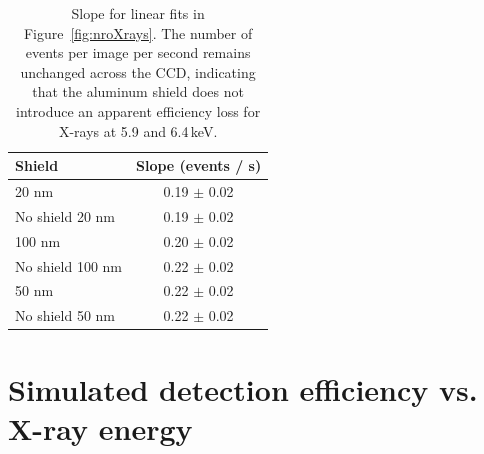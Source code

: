 \documentclass[twocolumn]{aastex631}
\begin{document}

\begin{table}
\centering
\begin{tabular}{lc}
\toprule
 Shield &  Slope (events / s) \\
 \midrule
 20 nm &  0.19 $\pm$ 0.02 \\
 No shield 20 nm & 0.19 $\pm$ 0.02 \\
 100 nm & 0.20 $\pm$ 0.02  \\
 No shield 100 nm & 0.22 $\pm$ 0.02   \\
 50 nm & 0.22 $\pm$ 0.02\\
 No shield 50 nm & 0.22 $\pm$ 0.02  \\
 \bottomrule
\end{tabular}
 \caption{Slope for linear fits in Figure~\ref{fig:nroXrays}. The number of events per image per second remains unchanged across the CCD, indicating that the aluminum shield does not introduce an apparent efficiency loss for X-rays at 5.9 and 6.4\,keV.}
 \label{table:results}
\end{table}

\section{Simulated detection efficiency vs. X-ray energy} \label{sec:sims}
\end{document}
